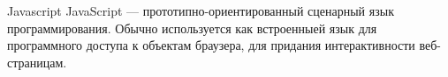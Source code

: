 \begin{frame}{Javascript}
JavaScript — прототипно-ориентированный сценарный язык программирования. Обычно используется как встроенныей язык для программного доступа к объектам браузера, для придания интерактивности веб-страницам.
\end{frame}